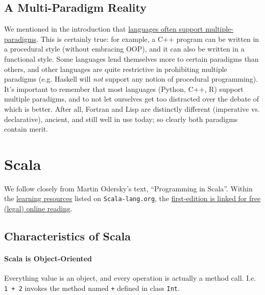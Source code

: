 \documentclass[12pt,letterpaper,twoside]{article}
\begin{document}
\subsection{A Multi-Paradigm Reality}
We mentioned in the introduction that 
\href{https://en.wikipedia.org/wiki/Comparison_of_multi-paradigm_programming_languages#Language_overview}
{languages often support multiple-paradigms}. This
is certainly true: for example, a C++ program can be written in a procedural style
(without embracing OOP), and it can also be written in a functional style. Some languages
lend themselves more to certain paradigms than others, and other languages
are quite restrictive in prohibiting multiple paradigms (e.g. Haskell will \emph{not} 
support any notion of procedural programming). It's important to remember that 
most languages (Python, C++, R) support multiple paradigms, and to not let ourselves
get too distracted over the debate of which is better. After all, 
Fortran and Lisp are distinctly different (imperative vs. declarative), ancient, and
still well in use today; so clearly both paradigms contain merit.

\section{Scala}
We follow closely from Martin Odersky's text, ``Programming in Scala''.
Within the \href{https://scala-lang.org/documentation/learn.html}{learning resources}
listed on \texttt{Scala-lang.org}, the 
\href{https://www.artima.com/pins1ed/}
{first-edition is linked for free (legal) online reading}.

\vspace{-3ex}
\subsection{Characteristics of Scala}
\paragraph{Scala is Object-Oriented}
Everything value is an object, and every operation is actually a method call.
I.e. \texttt{1 + 2} invokes the method named \texttt{+} defined in class \texttt{Int}.

\vspace{-3ex}
\end{document}
